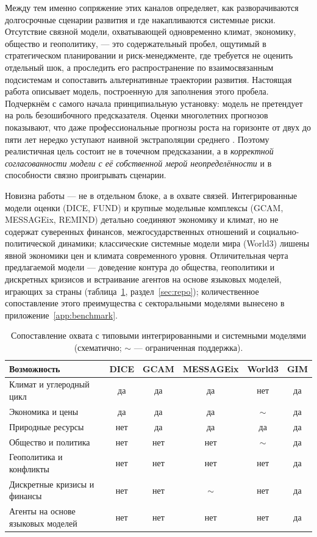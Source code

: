 \documentclass[11pt,a4paper]{article}
\begin{document}
Между тем именно сопряжение этих каналов определяет, как разворачиваются долгосрочные
сценарии развития и где накапливаются системные риски. Отсутствие связной модели, охватывающей
одновременно климат, экономику, общество и геополитику, --- это содержательный пробел,
ощутимый в стратегическом планировании и риск-менеджменте, где требуется не оценить отдельный
шок, а проследить его распространение по взаимосвязанным подсистемам и сопоставить
альтернативные траектории развития. Настоящая работа описывает модель, построенную для
заполнения этого пробела.
Подчеркнём с самого начала принципиальную установку: модель не претендует на роль
безошибочного предсказателя. Оценки многолетних прогнозов показывают, что даже
профессиональные прогнозы роста на горизонте от двух до пяти лет нередко уступают наивной
экстраполяции среднего \citep{celasun2021}. Поэтому реалистичная цель состоит не в точечном
предсказании, а в \emph{корректной согласованности модели с её собственной мерой
неопределённости} и в способности связно проигрывать сценарии.

Новизна работы --- не в отдельном блоке, а в охвате связей. Интегрированные модели оценки
(DICE, FUND) и крупные модельные комплексы (GCAM, MESSAGEix, REMIND) детально соединяют
экономику и климат, но не содержат суверенных финансов, межгосударственных отношений и
социально-политической динамики; классические системные модели мира (World3) лишены явной
экономики цен и климата современного уровня. Отличительная черта предлагаемой модели ---
доведение контура до общества, геополитики и дискретных кризисов и встраивание агентов на
основе языковых моделей, играющих за страны (таблица~\ref{tab:compare}, раздел~\ref{sec:repo});
количественное сопоставление этого преимущества с секторальными моделями вынесено в
приложение~\ref{app:benchmark}.

\begin{table}[t]
\centering
\caption{Сопоставление охвата с типовыми интегрированными и системными моделями (схематично;
$\sim$ --- ограниченная поддержка).}
\label{tab:compare}
\small
\begin{tabular}{@{}lccccc@{}}
\toprule
Возможность & DICE & GCAM & MESSAGEix & World3 & GIM \\
\midrule
Климат и углеродный цикл & да & да & да & нет & да \\
Экономика и цены & да & да & да & $\sim$ & да \\
Природные ресурсы & нет & да & да & да & да \\
Общество и политика & нет & нет & нет & $\sim$ & да \\
Геополитика и конфликты & нет & нет & нет & нет & да \\
Дискретные кризисы и финансы & нет & нет & $\sim$ & нет & да \\
Агенты на основе языковых моделей & нет & нет & нет & нет & да \\
\bottomrule
\end{tabular}
\end{table}
\end{document}
